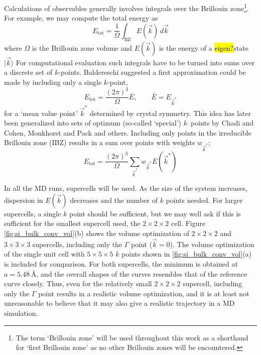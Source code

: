 \documentclass[11pt,bibliography=totoc,index=totoc]{scrbook}   %
\newcommand{\comment}[1]{\hl{#1}}
\begin{document}
Calculations of observables generally involves integrals over the Brillouin zone\footnote{The term `Brillouin zone' will be used throughout this work as
a shorthand for `first Brillouin zone' as no other Brillouin zones will be encountered.}. 
For example, we may compute the total energy as
\begin{equation}
  E_{\text{tot}} = \frac{1}{\Omega} \int_{\text{BZ}} E(\vec{k}) \,d\vec{k}
\end{equation}
where $\Omega$ is the Brillouin zone volume and $E(\vec{k})$ is the energy of a \comment{eigen?}state $|\vec{k}\rangle$
For computational evaluation such integrals have to be turned into sums over a discrete set of $k$-points. 
Baldereschi suggested a first approximation could be made by including only a single $k$-point,
\begin{equation}
  E_{\text{tot}} = \frac{(2\pi)^3}{\Omega} \bar{E}, \qquad \bar{E}=E_{\vec{k}^*}
\end{equation}
for a `mean value point' $\vec{k}^*$ determined by crystal symmetry\cite{Baldereschi:1973}. 
This idea has later been generalized into sets of optimum (so-called `special') $k$~points by Chadi and Cohen\cite{Chadi:1973},
Monkhorst and Pack\cite{MonkhorstPack:1976} and others.
Including only points in the irreducible Brillouin zone (IBZ) results in a sum over points with weights $w_{\vec{k}^*}$;
\begin{equation}
  E_{\text{tot}} = \frac{(2\pi)^3}{\Omega}\sum_{\vec{k}^*} w_{\vec{k}^*} E(\vec{k}^*)
\end{equation}

In all the MD runs, supercells will be used. As the size of the system increases, dispersion in $E(\vec{k})$ decreases and the number of $k$ points needed.
For larger supercells, a single $k$ point should be sufficient, but we may well ask if this is sufficient for the smallest supercell used, the $2\times2\times2$ cell. 
Figure \ref{fig:si_bulk_conv_vol}(b) shows the volume optimization of $2\times2\times2$ and $3\times3\times3$ supercells,
including only the $\Gamma$ point ($\vec{k}=0$). The volume optimization of the single unit cell with $5\times 5\times5$ $k$ points shown
in \ref{fig:si_bulk_conv_vol}(a) is included for comparison. For both supercells, the minimum is obtained at $a=\SI{5.48}{\angstrom}$,
and the overall shapes of the curves resembles that of the reference curve closely.
Thus, even for the relatively small $2\times 2\times 2$ supercell, including only the $\Gamma$ point results in a realistic volume optimization,
and it is at least not unreasonable to believe that it may also give a realistic trajectory in a MD simulation. 
\end{document}
